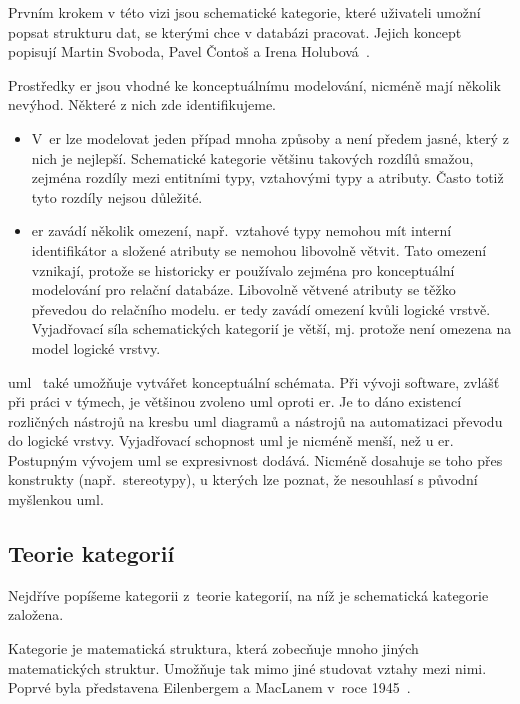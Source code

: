 Prvním krokem v této vizi jsou schematické kategorie, které uživateli umožní popsat strukturu dat, se kterými chce v databázi pracovat.
Jejich koncept popisují Martin Svoboda, Pavel Čontoš a Irena Holubová~\cite{svoboda_categorical_2021}.

Prostředky \acrshort{er} jsou vhodné ke konceptuálnímu modelování, nicméně mají několik nevýhod.
Některé z nich zde identifikujeme.
\begin{itemize}
  \item V~\acrshort{er} lze modelovat jeden případ mnoha způsoby a není předem jasné, který z nich je nejlepší.
        Schematické kategorie většinu takových rozdílů smažou, zejména rozdíly mezi entitními typy, vztahovými typy a atributy.
        Často totiž tyto rozdíly nejsou důležité.
  \item \acrshort{er} zavádí několik omezení, např.~vztahové typy nemohou mít interní identifikátor a složené atributy se nemohou libovolně větvit.
        Tato omezení vznikají, protože se historicky \acrshort{er} používalo zejména pro konceptuální modelování pro relační databáze.
        Libovolně větvené atributy se těžko převedou do relačního modelu.
        \acrshort{er} tedy zavádí omezení kvůli logické vrstvě.
        Vyjadřovací síla schematických kategorií je větší, mj. protože není omezena na model logické vrstvy.
\end{itemize}

\acrfull{uml}~\cite{omg_uml_2017} také umožňuje vytvářet konceptuální schémata.
Při vývoji software, zvlášť při práci v týmech, je většinou zvoleno \acrshort{uml} oproti \acrshort{er}.
Je to dáno existencí rozličných nástrojů na kresbu \acrshort{uml} diagramů a nástrojů na automatizaci převodu do logické vrstvy.
Vyjadřovací schopnost \acrshort{uml} je nicméně menší, než u \acrshort{er}.
Postupným vývojem \acrshort{uml} se expresivnost dodává.
Nicméně dosahuje se toho přes konstrukty (např.~stereotypy), u kterých lze poznat, že nesouhlasí s původní myšlenkou \acrshort{uml}.

\subsection{Teorie kategorií}

Nejdříve popíšeme kategorii z~teorie kategorií, na níž je schematická kategorie založena.

Kategorie je matematická struktura, která zobecňuje mnoho jiných matematických struktur.
Umožňuje tak mimo jiné studovat vztahy mezi nimi.
Poprvé byla představena Eilenbergem a MacLanem v~roce 1945~\cite{eilenberg_generaltheory_1945}.

